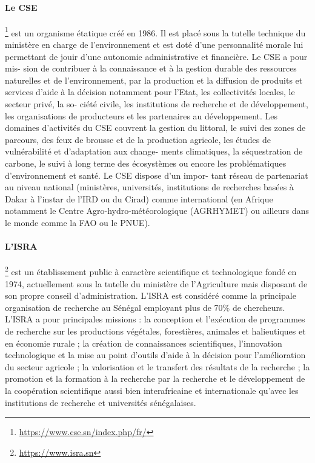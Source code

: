     \paragraph{Le CSE}\footnote{\url{https://www.cse.sn/index.php/fr/}} est un organisme étatique créé en 1986. Il est placé sous la tutelle technique
du ministère en charge de l’environnement et est doté d’une personnalité morale lui
permettant de jouir d’une autonomie administrative et financière. Le CSE a pour mis-
sion de contribuer à la connaissance et à la gestion durable des ressources naturelles et de l’environnement, par la production et la diffusion de produits et services d’aide
à la décision notamment pour l’Etat, les collectivités locales, le secteur privé, la so-
ciété civile, les institutions de recherche et de développement, les organisations de
producteurs et les partenaires au développement. Les domaines d’activités du CSE
couvrent la gestion du littoral, le suivi des zones de parcours, des feux de brousse
et de la production agricole, les études de vulnérabilité et d’adaptation aux change-
ments climatiques, la séquestration de carbone, le suivi à long terme des écosystèmes
ou encore les problématiques d’environnement et santé. Le CSE dispose d’un impor-
tant réseau de partenariat au niveau national (ministères, universités, institutions de
recherches basées à Dakar à l’instar de l’IRD ou du Cirad) comme international (en
Afrique notamment le Centre Agro-hydro-météorologique (AGRHYMET) ou ailleurs
dans le monde comme la FAO ou le PNUE).
    
    \paragraph{L'ISRA}\footnote{\url{https://www.isra.sn}} est un établissement public à caractère scientifique et technologique fondé
en 1974, actuellement sous la tutelle du ministère de l’Agriculture mais disposant de
son propre conseil d’administration. L’ISRA est considéré comme la principale organisation de recherche au Sénégal employant plus de 70\% de chercheurs. L’ISRA a
pour principales missions : la conception et l’exécution de programmes de recherche
sur les productions végétales, forestières, animales et halieutiques et en économie rurale ; la création de connaissances scientifiques, l’innovation technologique et la mise au point d’outils d’aide à la décision pour l’amélioration du secteur agricole ; la valorisation et le transfert des résultats de la recherche ; la promotion et la formation à la recherche par la recherche et le développement de la coopération scientifique aussi
bien interafricaine et internationale qu’avec les institutions de recherche et universités sénégalaises.
    
